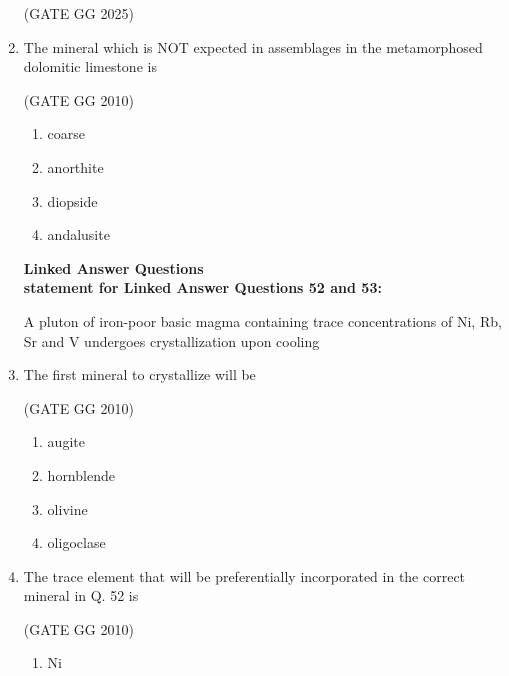 \documentclass[journal]{IEEEtran}
\begin{document}
\begin{enumerate}[start=1]
\hfill{(GATE GG 2025)}

\begin{enumerate}
\end{enumerate}

\item The mineral which is NOT expected in assemblages in the metamorphosed dolomitic limestone is

\hfill{(GATE GG 2010)}

\begin{enumerate}
    \item coarse
    \item  anorthite
\item diopside
\item andalusite

\end{enumerate}
\textbf{Linked Answer Questions}\\
\textbf{statement for Linked Answer Questions 52 and 53:}

A pluton of iron-poor basic magma containing trace concentrations of Ni, Rb, Sr and V undergoes crystallization upon cooling
\item The first mineral to crystallize will be

\hfill{(GATE GG 2010)}

\begin{enumerate}
    \item augite

 \item hornblende

 \item olivine

 \item oligoclase

\end{enumerate}

\item The trace element that will be preferentially incorporated in the correct mineral in Q. 52 is

\hfill{(GATE GG 2010)}

\begin{enumerate}
    \item Ni


\end{enumerate}
\end{enumerate}
\end{document}
